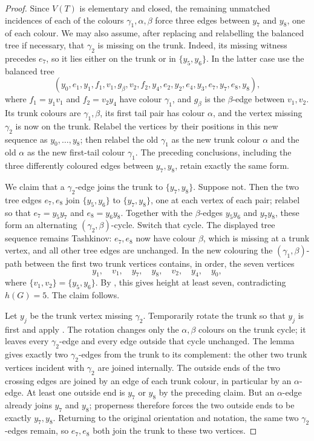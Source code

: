 \documentclass[11pt]{article}
\theoremstyle{definition}
\newcommand{\set}[1]{\{#1\}}
\begin{document}
\begin{proof}
Since $V(T)$ is elementary and closed, the remaining unmatched incidences
of each of the colours $\gamma_1,\alpha,\beta$ force three edges between
$y_7$ and $y_8$, one of each colour. We may also assume, after replacing
and relabelling the balanced tree if necessary, that $\gamma_2$ is missing
on the trunk. Indeed, its missing witness precedes $e_7$, so it lies either
on the trunk or in $\set{y_5,y_6}$. In the latter case use the balanced
tree
\[
 (y_0,e_1,y_1,f_1,v_1,g_\beta,v_2,f_2,y_4,
   e_2,y_2,e_4,y_3,e_7,y_7,e_8,y_8),
\]
where $f_1=y_1v_1$ and $f_2=v_2y_4$ have colour $\gamma_1$, and
$g_\beta$ is the $\beta$-edge between $v_1,v_2$. Its trunk colours are
$\gamma_1,\beta$, its first tail pair has colour $\alpha$, and the vertex
missing $\gamma_2$ is now on the trunk. Relabel the vertices by their
positions in this new sequence as $y_0,\ldots,y_8$; then relabel the old
$\gamma_1$ as the new trunk colour $\alpha$ and the old $\alpha$ as the
new first-tail colour $\gamma_1$. The preceding conclusions, including
the three differently coloured edges between $y_7,y_8$, retain exactly the
same form.

We claim that a $\gamma_2$-edge joins the trunk to
$\set{y_7,y_8}$. Suppose not. Then the two tree edges $e_7,e_8$ join
$\set{y_5,y_6}$ to $\set{y_7,y_8}$, one at each vertex of each pair;
relabel so that $e_7=y_5y_7$ and $e_8=y_6y_8$. Together with the
$\beta$-edges $y_5y_6$ and $y_7y_8$, these form an alternating
$(\gamma_2,\beta)$-cycle. Switch that cycle. The displayed tree sequence
remains Tashkinov: $e_7,e_8$ now have colour $\beta$, which is missing at
a trunk vertex, and all other tree edges are unchanged. In the new
colouring the $(\gamma_1,\beta)$-path between the first two trunk vertices
contains, in order, the seven vertices
\[
 y_1,
 \quad v_1,
 \quad y_7,
 \quad y_8,
 \quad v_2,
 \quad y_4,
 \quad y_0,
\]
where $\set{v_1,v_2}=\set{y_5,y_6}$. By , this gives
height at least seven, contradicting $h(G)=5$. The claim follows.

Let $y_j$ be the trunk vertex missing $\gamma_2$. Temporarily rotate
the trunk so that $y_j$ is first and apply . The rotation
changes only the $\alpha,\beta$ colours on the trunk cycle; it leaves every
$\gamma_2$-edge and every edge outside that cycle unchanged. The lemma gives
exactly two $\gamma_2$-edges from the trunk to its complement: the other two
trunk vertices incident with $\gamma_2$ are joined internally. The outside
ends of the two crossing edges are joined by an edge of each trunk colour,
in particular by an $\alpha$-edge. At least one outside end is $y_7$ or
$y_8$ by the preceding claim. But an $\alpha$-edge already joins $y_7$ and
$y_8$; properness therefore forces the two outside ends to be exactly
$y_7,y_8$. Returning to the original orientation and notation, the same two
$\gamma_2$-edges remain, so $e_7,e_8$ both join the trunk to these two
vertices.


\end{proof}
\end{document}

